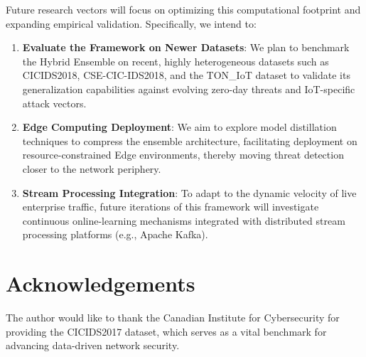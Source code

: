 Future research vectors will focus on optimizing this computational footprint and expanding empirical validation. Specifically, we intend to:
\begin{enumerate}
    \item \textbf{Evaluate the Framework on Newer Datasets}: We plan to benchmark the Hybrid Ensemble on recent, highly heterogeneous datasets such as CICIDS2018, CSE-CIC-IDS2018, and the TON\_IoT dataset to validate its generalization capabilities against evolving zero-day threats and IoT-specific attack vectors.
    \item \textbf{Edge Computing Deployment}: We aim to explore model distillation techniques to compress the ensemble architecture, facilitating deployment on resource-constrained Edge environments, thereby moving threat detection closer to the network periphery.
    \item \textbf{Stream Processing Integration}: To adapt to the dynamic velocity of live enterprise traffic, future iterations of this framework will investigate continuous online-learning mechanisms integrated with distributed stream processing platforms (e.g., Apache Kafka).
\end{enumerate}

\appendix
\section{Acknowledgements}
The author would like to thank the Canadian Institute for Cybersecurity for providing the CICIDS2017 dataset, which serves as a vital benchmark for advancing data-driven network security.
